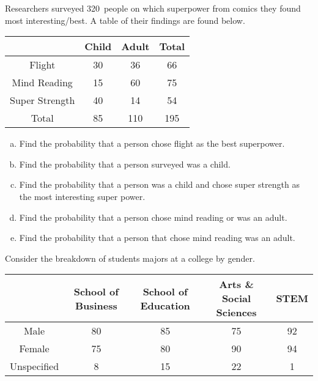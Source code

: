 \documentclass[11pt,letterpaper]{article}
\begin{document}

 Researchers surveyed 320~people on which superpower from comics they found most interesting/best. A table of their findings are found below.
	\begin{table}[!ht]
	\centering
	\begin{tabular}{|c||c|c||c|} \hline
	& Child & Adult & Total \\ \hline \hline
	Flight & 30 & 36 & 66 \\ \hline
	Mind Reading & 15 & 60 & 75 \\ \hline
	Super Strength & 40 & 14 & 54 \\ \hline \hline
	Total & 85 & 110 & 195 \\ \hline
	\end{tabular}
	\end{table}

\begin{enumerate}[(a)]
\item Find the probability that a person chose flight as the best superpower.
\item Find the probability that a person surveyed was a child.
\item Find the probability that a person was a child and chose super strength as the most interesting super power.
\item Find the probability that a person chose mind reading or was an adult.
\item Find the probability that a person that chose mind reading was an adult. 
\end{enumerate}


\newpage



 Consider the breakdown of students majors at a college by gender.
	\begin{table}[!ht]
	\centering
	\begin{tabular}{|c||c|c|c|c|} \hline
	& School of Business & School of Education & Arts \& Social Sciences & STEM \\ \hline \hline
	Male & 80 & 85 & 75 & 92 \\ \hline
	Female & 75 & 80 & 90 & 94 \\ \hline
	Unspecified & 8 & 15 & 22 & 1 \\ \hline
	\end{tabular}
	\end{table}
\end{document}
